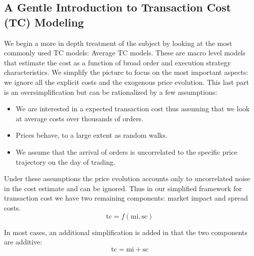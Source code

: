 \subsection{A Gentle Introduction to Transaction Cost (TC) Modeling}

We begin a more in depth treatment of the subject by looking at the most commonly used TC models: Average TC models. These are macro level models that estimate the cost as a function of broad order and execution strategy characteristics. We simplify the picture to focus on the most important aspects: we ignore all the explicit costs and the exogenous price evolution. This last part is an oversimplification but can be rationalized by a few assumptions:
        \begin{itemize}
         \item We are interested in a expected transaction cost thus assuming that we look at average costs over thousands of orders.
         \item Prices behave, to a large extent as random walks.
         \item We assume that the arrival of orders is uncorrelated to the specific price trajectory on the day of trading. 
         \end{itemize} 


Under these assumptions the price evolution accounts only to uncorrelated noise in the cost estimate and can be ignored. Thus in our simplified framework for transaction cost we have two remaining components: market impact and spread costs. 
        \begin{equation}\label{eq:tc_1}
        \text{tc}= f(\text{mi},\text{sc})
        \end{equation}


In most cases, an additional simplification is added in that the two components are additive:
        \begin{equation}\label{eq:tc_2}
        \text{tc}= \text{mi} + \text{sc}
        \end{equation}


